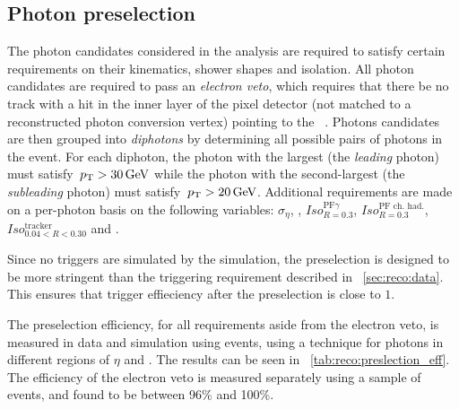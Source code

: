 \subsection{Photon preselection}
 \label{reco:sec:pho:preselection}

The photon candidates considered in the \Hgg analysis are required to satisfy certain requirements on their kinematics, shower shapes and isolation. All photon candidates are required to pass an \emph{electron veto}, which requires that there be no track with a hit in the inner layer of the pixel detector (not matched to a reconstructed photon conversion vertex) pointing to the \SC~\cite{CMS-PAS-EGM-14-001}. Photons candidates are then grouped into \emph{diphotons} by determining all possible pairs of photons in the event. For each diphoton, the photon with the largest \pT (the \emph{leading} photon) must satisfy $\,p_\text{T}>30\,\text{Ge\hspace{-.08em}V}$ while the photon with the second-largest \pT (the \emph{subleading} photon) must satisfy $\,p_\text{T}>20\,\text{Ge\hspace{-.08em}V}$. Additional requirements are made on a per-photon basis on the following variables: $\sigma_{\eta}$, \HoE, $Iso^{\textrm{PF}\gamma}_{R=0.3}$, $Iso^{\textrm{PF ch. had.}}_{R=0.3}$, $Iso^{\textrm{tracker}}_{0.04<R<0.30}$ and \RNINE. 

Since no triggers are simulated by the simulation, the preselection is designed to be more stringent than the triggering requirement described in \Sec~\ref{sec:reco:data}. This ensures that trigger effieciency after the preselection is close to $1$.  

The preselection efficiency, for all requirements aside from the electron veto, is measured in data and simulation using \Zee events, using a \TagAndProbe technique for photons in different regions of $\eta$ and \RNINE. The results can be seen in \Table~\ref{tab:reco:preslection_eff}. The efficiency of the electron veto is measured separately using a sample of \Zmmg events, and found to be between 96\% and 100\%.

